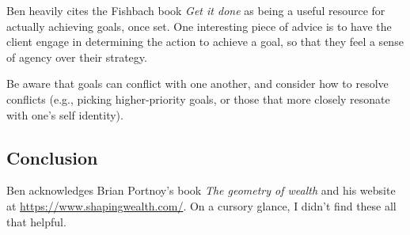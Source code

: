 \documentclass{article}
\begin{document}
Ben heavily cites the Fishbach book {\it Get it done} as being a useful resource for actually achieving goals, once set.  One interesting piece of advice is to have the client engage in determining the action to achieve a goal, so that they feel a sense of agency over their strategy.

Be aware that goals can conflict with one another, and consider how to resolve conflicts (e.g., picking higher-priority goals, or those that more closely resonate with one's self identity).

\subsection{Conclusion}

Ben acknowledges Brian Portnoy's book {\it The geometry of wealth} and his website at \url{https://www.shapingwealth.com/}.  On a cursory glance, I didn't find these all that helpful.



\end{document}
